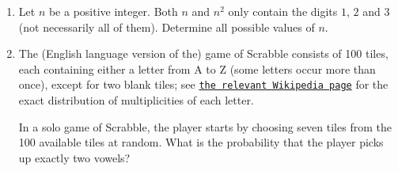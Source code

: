 \documentclass[a4paper,12pt,titlepage]{article}
\begin{document}
\begin{enumerate}[1.]








\item %
Let $n$ be a positive integer. Both $n$ and $n^2$ only contain the digits $1$, $2$ and $3$ (not necessarily all of them). Determine all possible values of $n$.




\item %
The (English language version of the) game of Scrabble\texttrademark{} consists of 100 tiles, each containing either a letter from A to Z (some letters occur more than once), except for two blank tiles; see \href{https://en.wikipedia.org/wiki/Scrabble_letter_distributions#English}{\texttt{the relevant Wikipedia page}} for the exact distribution of multiplicities of each letter.

In a solo game of Scrabble, the player starts by choosing seven tiles from the 100 available tiles at random. What is the probability that the player picks up exactly two vowels?


\end{enumerate}

\newpage
\end{document}
